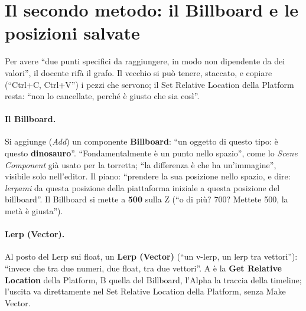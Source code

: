 \section{Il secondo metodo: il Billboard e le posizioni salvate}
\label{ue6:sec:metodo2}

Per avere ``due punti specifici da raggiungere, in modo non dipendente da dei valori'',
il docente rifà il grafo. Il vecchio si può tenere, staccato, e copiare (``Ctrl+C,
Ctrl+V'') i pezzi che servono; il Set Relative Location della Platform resta: ``non lo
cancellate, perché è giusto che sia così''.

\paragraph{Il Billboard.} Si aggiunge (\emph{Add}) un componente \textbf{Billboard}:
``un oggetto di questo tipo: è questo \textbf{dinosauro}''. ``Fondamentalmente è un punto
nello spazio'', come lo \emph{Scene Component} già usato per la torretta; ``la
differenza è che ha un'immagine'', visibile solo nell'editor. Il piano: ``prendere la sua
posizione nello spazio, e dire: \emph{lerpami} da questa posizione della piattaforma
iniziale a questa posizione del billboard''. Il Billboard si mette a \textbf{500} sulla
Z (``o di più? 700? Mettete 500, la metà è giusta'').

\paragraph{Lerp (Vector).} Al posto del Lerp sui float, un \textbf{Lerp (Vector)} (``un
v-lerp, un lerp tra vettori''): ``invece che tra due numeri, due float, tra due
vettori''. A è la \textbf{Get Relative Location} della Platform, B quella del Billboard,
l'Alpha la traccia della timeline; l'uscita va direttamente nel Set Relative Location
della Platform, senza Make Vector.

